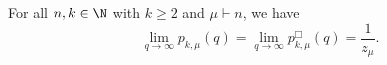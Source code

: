 \begin{theorem}
\label{intro_version_p}
For all \(n,k \in \N\) with \(k \geq 2\) and \(\mu \vdash n\), we have
\begin{equation}
\lim_{q \to \infty} p_{k,\mu}      (q) =
\lim_{q \to \infty} p_{k,\mu}^\Box (q) =
\frac{1}{z_\mu}.
\end{equation}
\end{theorem}
